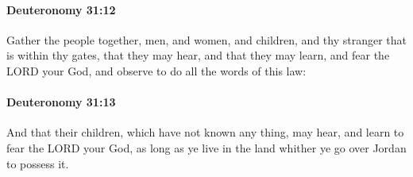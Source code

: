 		\paragraph{Deuteronomy 31:12} %
			\label{DEUTERONOMY-31-12}

			Gather the people together, men, and women, and children, and thy stranger that is within thy gates, that they may hear, and that they may learn, and fear the LORD your God, and observe to do all the words of this law:


		\paragraph{Deuteronomy 31:13} %
			\label{DEUTERONOMY-31-13}

			And that their children, which have not known any thing, may hear, and learn to fear the LORD your God, as long as ye live in the land whither ye go over Jordan to possess it.


